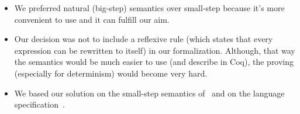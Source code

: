 \documentclass[12pt]{article}
\theoremstyle{definition}
\newcommand{\vsp}{\vspace{0.4cm}}
\numberwithin{equation}{section}
\begin{document}
\vsp


\begin{itemize}
	\item We preferred natural (big-step) semantics over small-step because it's more convenient to use and it can fulfill our aim.
	\item Our decision was not to include a reflexive rule (which states that every expression can be rewritten to itself) in our formalization. Although, that way the semantics would be much easier to use (and describe in Coq), the proving (especially for determinism) would become very hard.
	\item We based our solution on the small-step semantics of~\cite{nishida2016reversible} and on the language specification~\cite{carlsson2000core}.
\end{itemize}
\end{document}
